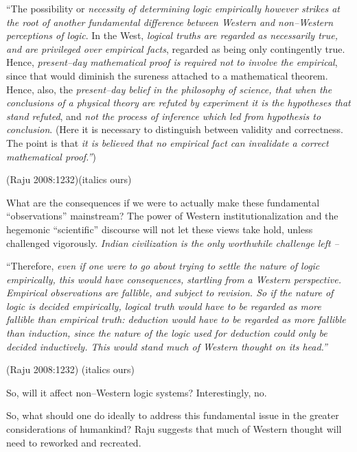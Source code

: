 \begin{myquote}
“The possibility or \textit{necessity of determining logic empirically however strikes at the root of another fundamental difference between Western and non–Western perceptions of logic}. In the West, \textit{logical truths are regarded as necessarily true, and are privileged over empirical facts}, regarded as being only contingently true. Hence, \textit{present–day mathematical proof is required not to involve the empirical}, since that would diminish the sureness attached to a mathematical theorem. Hence, also, the \textit{present–day belief in the philosophy of science, that when the conclusions of a physical theory are refuted by experiment it is the hypotheses that stand refuted}, and \textit{not the process of inference which led from hypothesis to conclusion}. (Here it is necessary to distinguish between validity and correctness. The point is that \textit{it is believed that no empirical fact can invalidate a correct mathematical proof.”})
\end{myquote}

\hfill (Raju 2008:1232)(italics ours)

What are the consequences if we were to actually make these fundamental “observations” mainstream? The power of Western institutionalization and the hegemonic “scientific” discourse will not let these views take hold, unless challenged vigorously. \textit{Indian civilization is the only worthwhile challenge left –}

\begin{myquote}
“Therefore, \textit{even if one were to go about trying to settle the nature of logic empirically, this would have consequences, startling from a Western perspective. Empirical observations are fallible, and subject to revision. So if the nature of logic is decided empirically, logical truth would have to be regarded as more fallible than empirical truth: deduction would have to be regarded as more fallible than induction, since the nature of the logic used for deduction could only be decided inductively. This would stand much of Western thought on its head.”}
\end{myquote}

\hfill (Raju 2008:1232) (italics ours)

So, will it affect non–Western logic systems? Interestingly, no.

So, what should one do ideally to address this fundamental issue in the greater considerations of humankind? Raju suggests that much of Western thought will need to reworked and recreated.

